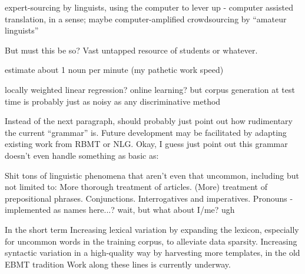 expert-sourcing by linguists, using the computer to lever up - computer assisted translation, in a sense; maybe computer-amplified
crowdsourcing by ``amateur linguists''

But must this be so? Vast untapped resource of students or whatever.

estimate about 1 noun per minute (my pathetic work speed)

locally weighted linear regression? online learning?
but corpus generation at test time is probably just as noisy as any discriminative method

Instead of the next paragraph, should probably just point out how rudimentary the current ``grammar'' is. 
Future development may be facilitated by adapting existing work from RBMT or NLG. 
Okay, I guess just point out this grammar doesn't even handle something as basic as:

Shit tons of linguistic phenomena that aren't even that uncommon, including but not limited to:
More thorough treatment of articles.
(More) treatment of prepositional phrases.
Conjunctions.
Interrogatives and imperatives.
Pronouns - implemented as names here...? wait, but what about I/me? ugh

In the short term
Increasing lexical variation by expanding the lexicon, especially for uncommon words in the training corpus, to alleviate data sparsity.
Increasing syntactic variation in a high-quality way by harvesting more templates, in the old EBMT tradition
Work along these lines is currently underway.








